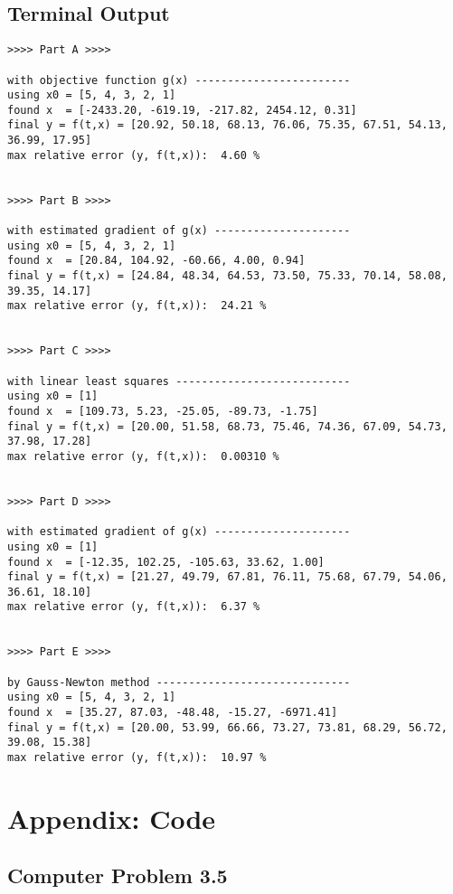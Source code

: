 \documentclass[paper=a4, fontsize=11pt]{scrartcl}
\numberwithin{equation}{section}		%
\numberwithin{figure}{section}			%
\numberwithin{table}{section}				%
\begin{document}
\vspace{4mm}
\subsection{Terminal Output}
\begin{verbatim}
>>>> Part A >>>>

with objective function g(x) ------------------------
using x0 = [5, 4, 3, 2, 1]
found x  = [-2433.20, -619.19, -217.82, 2454.12, 0.31]
final y = f(t,x) = [20.92, 50.18, 68.13, 76.06, 75.35, 67.51, 54.13, 36.99, 17.95]
max relative error (y, f(t,x)):  4.60 %


>>>> Part B >>>>

with estimated gradient of g(x) ---------------------
using x0 = [5, 4, 3, 2, 1]
found x  = [20.84, 104.92, -60.66, 4.00, 0.94]
final y = f(t,x) = [24.84, 48.34, 64.53, 73.50, 75.33, 70.14, 58.08, 39.35, 14.17]
max relative error (y, f(t,x)):  24.21 %


>>>> Part C >>>>

with linear least squares ---------------------------
using x0 = [1]
found x  = [109.73, 5.23, -25.05, -89.73, -1.75]
final y = f(t,x) = [20.00, 51.58, 68.73, 75.46, 74.36, 67.09, 54.73, 37.98, 17.28]
max relative error (y, f(t,x)):  0.00310 %


>>>> Part D >>>>

with estimated gradient of g(x) ---------------------
using x0 = [1]
found x  = [-12.35, 102.25, -105.63, 33.62, 1.00]
final y = f(t,x) = [21.27, 49.79, 67.81, 76.11, 75.68, 67.79, 54.06, 36.61, 18.10]
max relative error (y, f(t,x)):  6.37 %


>>>> Part E >>>>

by Gauss-Newton method ------------------------------
using x0 = [5, 4, 3, 2, 1]
found x  = [35.27, 87.03, -48.48, -15.27, -6971.41]
final y = f(t,x) = [20.00, 53.99, 66.66, 73.27, 73.81, 68.29, 56.72, 39.08, 15.38]
max relative error (y, f(t,x)):  10.97 %
\end{verbatim}



\pagebreak
\section{Appendix: Code}

\subsection{Computer Problem 3.5}

\end{document}
